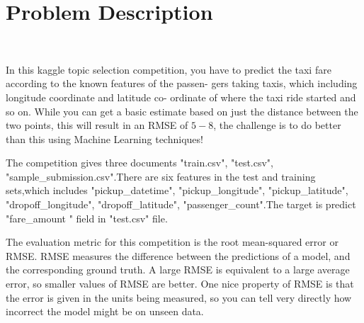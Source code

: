 \section{Problem Description}\label{sec-intro}









\




In this kaggle topic selection competition, you have to predict the taxi fare according to the known features of the passen-
gers taking taxis, which including longitude coordinate and latitude co-
ordinate of where the taxi ride started and so on. While you can get a basic estimate based on just the distance between the two points, this will result in an RMSE of $5-$8, the challenge is to do better than this using Machine Learning techniques!

The competition gives three documents "train.csv", "test.csv", "sample_submission.csv".There are six features in the test and training sets,which includes "pickup_datetime", "pickup_longitude", "pickup_latitude", "dropoff_longitude", "dropoff_latitude", "passenger_count".The target is predict "fare_amount " field in "test.csv" file.

The evaluation metric for this competition is the root mean-squared error or RMSE. RMSE measures the difference between the predictions of a model, and the corresponding ground truth. A large RMSE is equivalent to a large average error, so smaller values of RMSE are better. One nice property of RMSE is that the error is given in the units being measured, so you can tell very directly how incorrect the model might be on unseen data.

